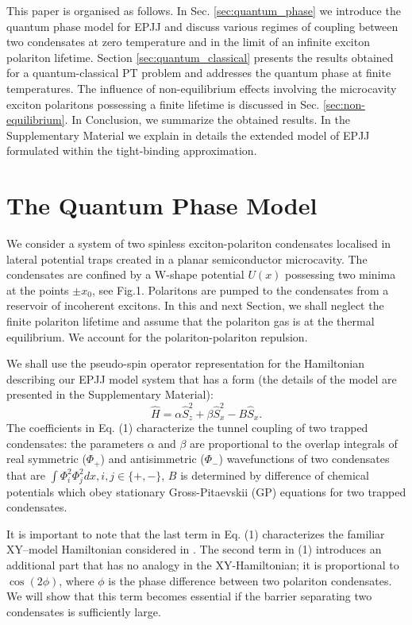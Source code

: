 \documentclass[aps, pre, preprint, groupedaddress, superscriptaddress, showkeys, showpacs] {revtex4-1}
\begin{document}
This paper is organised as follows.
In Sec. \ref{sec:quantum_phase} we introduce the quantum phase model for EPJJ and discuss various regimes of coupling between two condensates at zero temperature and in the limit of an infinite exciton polariton lifetime.
Section \ref{sec:quantum_classical} presents the results obtained for a quantum-classical PT problem and addresses the quantum phase at finite temperatures.
The influence of non-equilibrium effects involving the microcavity exciton polaritons possessing a finite lifetime is discussed in Sec. \ref{sec:non-equilibrium}.      
In Conclusion, we summarize the obtained results.
In the Supplementary Material we explain in details the extended model of EPJJ formulated within the tight-binding approximation.
 
\section{The Quantum Phase Model \label{sec:quantum_phase}}

We consider a system of two spinless exciton-polariton condensates localised in lateral potential traps created in a planar semiconductor microcavity.
The condensates are confined by a W-shape potential $U(x)$ possessing two minima at the points $\pm x_0$, see Fig.1.
Polaritons are pumped to the condensates from a reservoir of incoherent excitons. In this and next Section, we shall neglect the finite polariton lifetime and assume that the polariton gas is at the thermal equilibrium.   
We account for the polariton-polariton repulsion.

We shall use the pseudo-spin operator representation for the Hamiltonian describing our EPJJ model system that has a form (the details of the model are presented in the Supplementary Material): 
%
\begin{equation}
\hat{H} = \alpha \hat{S}_z^2 + \beta \hat{S}_x^2 - B \hat{S}_x.
\label{eq:hamiltonian_spin}
\end{equation}
%
The coefficients in Eq. (1) characterize the tunnel coupling of two trapped condensates:
the parameters $\alpha$ and $\beta$ are proportional to the overlap integrals of real symmetric ($\Phi_+$) and antisimmetric ($\Phi_-$) wavefunctions of two condensates that are
$\int \Phi_i^2 \Phi_j^2 dx, i,j \in \{+,-\}$, $B$ is determined by difference of chemical potentials which obey stationary Gross-Pitaevskii (GP) equations for two trapped condensates.

It is important to note that the last term in Eq. (1) characterizes the familiar XY--model Hamiltonian  considered in
\cite{Lago1, Lago2}.
The second term in (1) introduces an additional part that has no analogy in the XY-Hamiltonian; it is proportional to $\cos(2\phi)$, where $\phi$ is the phase difference between two polariton condensates.
We will show that this term becomes essential if the barrier separating two condensates is sufficiently large.
\end{document}
